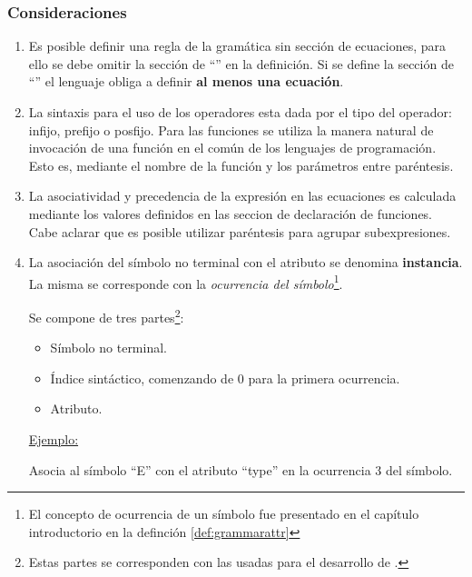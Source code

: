 \subsubsection*{Consideraciones}
\label{subsec:consirule}
\begin{enumerate}
\item Es posible definir una regla de la gramática sin sección de ecuaciones, para ello se debe omitir la sección de ``'' en la definición. Si se define la sección de ``'' el lenguaje obliga a definir \textbf{al menos una ecuación}.

\item La sintaxis para el uso de los operadores esta dada por el tipo del operador: infijo, prefijo o posfijo. Para las funciones se utiliza la manera natural de invocación de una función en el común de los lenguajes de programación. Esto es, mediante el nombre de la función y los parámetros entre paréntesis.

\item La asociatividad y precedencia de la expresión en las ecuaciones es calculada mediante los valores definidos en las seccion de declaración de funciones. Cabe aclarar que es posible utilizar paréntesis para agrupar subexpresiones.

\item La asociación del símbolo no terminal con el atributo se denomina \textbf{instancia}. La misma se corresponde con la \textit{ocurrencia del símbolo}\footnote{El concepto de ocurrencia de un símbolo fue presentado en el capítulo introductorio en la definción \ref{def:grammarattr}}. 

Se compone de tres partes\footnote{Estas partes se corresponden con las usadas para el desarrollo de \maggen.}:
\begin{itemize}
\item Símbolo no terminal.
\item Índice sintáctico, comenzando de 0 para la primera ocurrencia.
\item Atributo.
\end{itemize}
\underline{Ejemplo:}
\vspace{0.2cm}
\begin{center}
\end{center} 

Asocia al símbolo ``E'' con el atributo ``type'' en la ocurrencia 3 del símbolo.

\end{enumerate}


